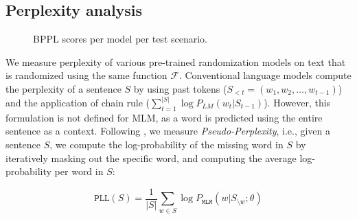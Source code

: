 \documentclass[letterpaper, 12pt]{report}
\begin{document}
\subsection{Perplexity analysis}

\begin{figure}[t]
    \centering
    \caption{BPPL scores per model per test scenario.}
    \label{fig:bpplm}
\end{figure}

We measure perplexity of various pre-trained randomization models on text that is randomized using the same function $\mathcal{F}$. Conventional language models compute the perplexity of a sentence $S$ by using past tokens ($S_{<t} = (w_1, w_2, \ldots, w_{t-1})$) and the application of chain rule ($\sum_{t=1}^{|S|} \log P_{\textit{LM}}(w_t | S_{t-1})$). However, this formulation is not defined for MLM, as a word is predicted using the entire sentence as a context.  Following \citet{salazar2020a}, we measure \textit{Pseudo-Perplexity}, i.e., given a sentence $S$, we compute the log-probability of the missing word in $S$ by iteratively masking out the specific word, and computing the average log-probability per word in $S$:

\begin{equation}
    \texttt{PLL}(S) = \frac{1}{|S|} \sum_{w \in S} \log P_{\texttt{MLM}} (w | S_{\setminus w}; \theta)
\end{equation}
\end{document}
